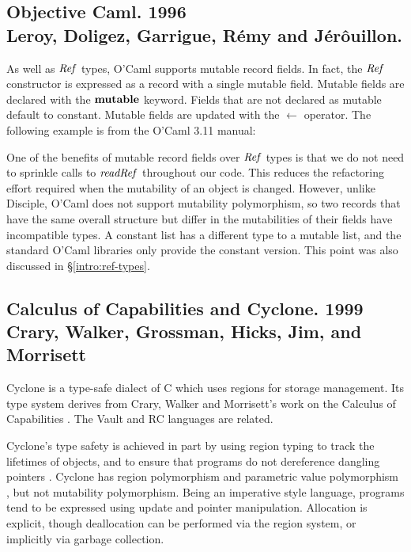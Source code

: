 \subsection{Objective Caml. 1996 \\
	Leroy, Doligez, Garrigue, R\'{e}my and J\'{e}r\^ouillon.}

As well as $\operatorname{\mathit{Ref}}$ types, O'Caml \cite{leroy:ocaml-3.11} supports mutable record fields. In fact, the $\operatorname{\mathit{Ref}}$ constructor is expressed as a record with a single mutable field. Mutable fields are declared with the $\textrm{\textbf{mutable}}$ keyword. Fields that are not declared as mutable default to constant. Mutable fields are updated with the $\leftarrow$ operator. The following example is from the O'Caml 3.11 manual:


One of the benefits of mutable record fields over $\operatorname{\mathit{Ref}}$ types is that we do not need to sprinkle calls to $\operatorname{\mathit{readRef}}$ throughout our code. This reduces the refactoring effort required when the mutability of an object is changed. However, unlike Disciple, O'Caml does not support mutability polymorphism, so two records that have the same overall structure but differ in the mutabilities of their fields have incompatible types. A constant list has a different type to a mutable list, and the standard O'Caml libraries only provide the constant version. This point was also discussed in \S\ref{intro:ref-types}.


\subsection{Calculus of Capabilities and Cyclone. 1999 \\ Crary, Walker, Grossman, Hicks, Jim, and Morrisett}
\label{System:Comparisons:CalculusOfCapabilities}

Cyclone \cite{jim:cyclone} is a type-safe dialect of C which uses regions for storage management. Its type system derives from Crary, Walker and Morrisett's work on the Calculus of Capabilities \cite{crary:capabilities}. The Vault \cite{deline:vault} and RC \cite{gay:rc} languages are related.

Cyclone's type safety is achieved in part by using region typing to track the lifetimes of objects, and to ensure that programs do not dereference dangling pointers \cite{grossman:region-cyclone}. Cyclone has region polymorphism and parametric value polymorphism \cite{grossman:quantified-imperative}, but not mutability polymorphism. Being an imperative style language, programs tend to be expressed using update and pointer manipulation. Allocation is explicit, though deallocation can be performed via the region system, or implicitly via garbage collection.


